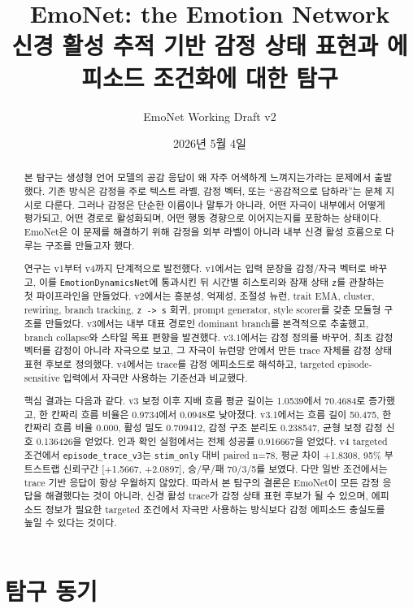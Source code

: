 \documentclass[11pt,a4paper]{article}
\title{\textbf{EmoNet: the Emotion Network}\\
\large 신경 활성 추적 기반 감정 상태 표현과 에피소드 조건화에 대한 탐구}
\author{EmoNet Working Draft v2}
\date{2026년 5월 4일}
\newcommand{\eng}[1]{\texttt{#1}}
\begin{document}
\onehalfspacing
\maketitle

\begin{abstract}
본 탐구는 생성형 언어 모델의 공감 응답이 왜 자주 어색하게 느껴지는가라는 문제에서 출발했다. 기존 방식은 감정을 주로 텍스트 라벨, 감정 벡터, 또는 ``공감적으로 답하라''는 문체 지시로 다룬다. 그러나 감정은 단순한 이름이나 말투가 아니라, 어떤 자극이 내부에서 어떻게 평가되고, 어떤 경로로 활성화되며, 어떤 행동 경향으로 이어지는지를 포함하는 상태이다. EmoNet은 이 문제를 해결하기 위해 감정을 외부 라벨이 아니라 내부 신경 활성 흐름으로 다루는 구조를 만들고자 했다.

연구는 v1부터 v4까지 단계적으로 발전했다. v1에서는 입력 문장을 감정/자극 벡터로 바꾸고, 이를 \eng{EmotionDynamicsNet}에 통과시킨 뒤 시간별 히스토리와 잠재 상태 \eng{z}를 관찰하는 첫 파이프라인을 만들었다. v2에서는 흥분성, 억제성, 조절성 뉴런, trait EMA, cluster, rewiring, branch tracking, \eng{z -> s} 회귀, prompt generator, style scorer를 갖춘 모듈형 구조를 만들었다. v3에서는 내부 대표 경로인 dominant branch를 본격적으로 추출했고, branch collapse와 스타일 목표 편향을 발견했다. v3.1에서는 감정 정의를 바꾸어, 최초 감정 벡터를 감정이 아니라 자극으로 보고, 그 자극이 뉴런망 안에서 만든 trace 자체를 감정 상태 표현 후보로 정의했다. v4에서는 trace를 감정 에피소드로 해석하고, targeted episode-sensitive 입력에서 자극만 사용하는 기준선과 비교했다.

핵심 결과는 다음과 같다. v3 보정 이후 지배 흐름 평균 길이는 1.0539에서 70.4684로 증가했고, 한 칸짜리 흐름 비율은 0.9734에서 0.0948로 낮아졌다. v3.1에서는 흐름 길이 50.475, 한 칸짜리 흐름 비율 0.000, 활성 밀도 0.709412, 감정 구조 분리도 0.238547, 균형 보정 감정 신호 0.136426을 얻었다. 인과 확인 실험에서는 전체 성공률 0.916667을 얻었다. v4 targeted 조건에서 \eng{episode\_trace\_v3}는 \eng{stim\_only} 대비 paired n=78, 평균 차이 +1.8308, 95\% 부트스트랩 신뢰구간 [+1.5667, +2.0897], 승/무/패 70/3/5를 보였다. 다만 일반 조건에서는 trace 기반 응답이 항상 우월하지 않았다. 따라서 본 탐구의 결론은 EmoNet이 모든 감정 응답을 해결했다는 것이 아니라, 신경 활성 trace가 감정 상태 표현 후보가 될 수 있으며, 에피소드 정보가 필요한 targeted 조건에서 자극만 사용하는 방식보다 감정 에피소드 충실도를 높일 수 있다는 것이다.
\end{abstract}

\tableofcontents
\newpage

\section{탐구 동기}
\end{document}
